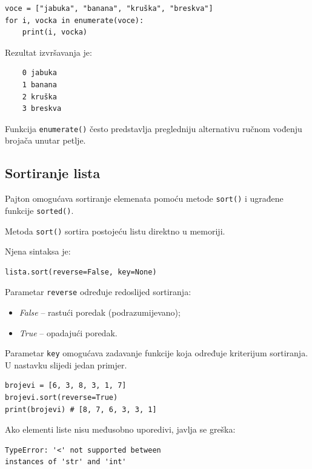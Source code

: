 \begin{verbatim}
voce = ["jabuka", "banana", "kruška", "breskva"]
for i, vocka in enumerate(voce):
    print(i, vocka)
\end{verbatim}

Rezultat izvršavanja je:

\begin{verbatim}
	0 jabuka
	1 banana
	2 kruška
	3 breskva
\end{verbatim}

Funkcija \texttt{enumerate()} često predstavlja pregledniju alternativu ručnom vođenju brojača unutar petlje.

\subsection{Sortiranje lista}

Pajton omogućava sortiranje elemenata pomoću metode \texttt{sort()} i ugrađene funkcije \texttt{sorted()}.

Metoda \texttt{sort()} sortira postojeću listu direktno u memoriji.

Njena sintaksa je:

\begin{verbatim}
lista.sort(reverse=False, key=None)
\end{verbatim}

Parametar \texttt{reverse} određuje redoslijed sortiranja:

\begin{itemize}
	\item \textit{False} -- rastući poredak (podrazumijevano);
	\item \textit{True} -- opadajući poredak.
\end{itemize}

Parametar \texttt{key} omogućava zadavanje funkcije koja određuje kriterijum sortiranja. U nastavku slijedi jedan primjer. 

\begin{verbatim}
brojevi = [6, 3, 8, 3, 1, 7]
brojevi.sort(reverse=True)
print(brojevi) # [8, 7, 6, 3, 3, 1]
\end{verbatim}

Ako elementi liste nisu međusobno uporedivi, javlja se greška:

\begin{verbatim}
TypeError: '<' not supported between
instances of 'str' and 'int'
\end{verbatim}


